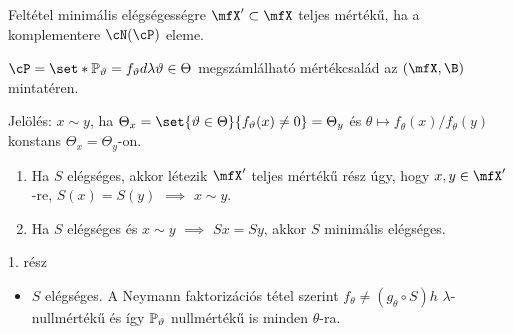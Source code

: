 \documentclass[aspectratio=169,notheorems,9pt,\option]{beamer}
\begin{document}
\begin{frame}{Feltétel minimális elégségességre}
  $\mfX'\subset\mfX$ teljes mértékű, ha a komplementere $\cN(\cP)$ eleme.
  \begin{theorem} $\cP=\set*{\P[\theta]=f_\theta d\lambda}{\theta\in\Theta}$ megszámlálható
     mértékcsalád az $(\mfX,\B)$ mintatéren.

     Jelölés: $x\sim y$, ha $\Theta_x=\set{\theta\in\Theta}{f_\theta(x)\neq0}=\Theta_y$ és 
     $\theta\mapsto f_\theta(x)/f_{\theta}(y)$ konstans $\Theta_x=\Theta_y$-on.
    \begin{enumerate}[<*>]
      \item Ha $S$ elégséges, akkor létezik $\mfX'$ teljes mértékű rész úgy, 
      hogy $x,y\in\mfX'$-re, $S(x)=S(y)$ $\implies$  $x\sim y$.
      \item Ha $S$ elégséges és  $x\sim y$ $\implies$ $Sx=Sy$, akkor $S$ minimális elégséges. 
    \end{enumerate}
  \end{theorem}
  1. rész
  \begin{itemize}
    \item $S$ elégséges. A Neymann faktorizációs tétel szerint
    $f_\theta\neq (g_\theta\circ S)h$ $\lambda$-nullmértékű
    és így $\P[\theta]$ nullmértékű is minden $\theta$-ra. 


\end{itemize}
\end{frame}
\end{document}
